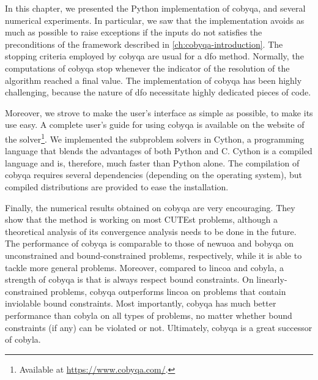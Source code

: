 In this chapter, we presented the Python implementation of \gls{cobyqa}, and several numerical experiments.
In particular, we saw that the implementation avoids as much as possible to raise exceptions if the inputs do not satisfies the preconditions of the framework described in \cref{ch:cobyqa-introduction}.
The stopping criteria employed by \gls{cobyqa} are usual for a \gls{dfo} method.
Normally, the computations of \gls{cobyqa} stop whenever the indicator of the resolution of the algorithm reached a final value.
The implementation of \gls{cobyqa} has been highly challenging, because the nature of \gls{dfo} necessitate highly dedicated pieces of code.

Moreover, we strove to make the user's interface as simple as possible, to make its use easy.
A complete user's guide for using \gls{cobyqa} is available on the website of the solver\footnote{Available at \url{https://www.cobyqa.com/}.}.
We implemented the subproblem solvers in Cython, a programming language that blends the advantages of both Python and C.
Cython is a compiled language and is, therefore, much faster than Python alone.
The compilation of \gls{cobyqa} requires several dependencies (depending on the operating system), but compiled distributions are provided to ease the installation.

Finally, the numerical results obtained on \gls{cobyqa} are very encouraging.
They show that the method is working on most CUTEst problems, although a theoretical analysis of its convergence analysis needs to be done in the future.
The performance of \gls{cobyqa} is comparable to those of \gls{newuoa} and \gls{bobyqa} on unconstrained and bound-constrained problems, respectively, while it is able to tackle more general problems.
Moreover, compared to \gls{lincoa} and \gls{cobyla}, a strength of \gls{cobyqa} is that is always respect bound constraints.
On linearly-constrained problems, \gls{cobyqa} outperforms \gls{lincoa} on problems that contain inviolable bound constraints.
Most importantly, \gls{cobyqa} has much better performance than \gls{cobyla} on all types of problems, no matter whether bound constraints (if any) can be violated or not.
Ultimately, \gls{cobyqa} is a great successor of \gls{cobyla}.
